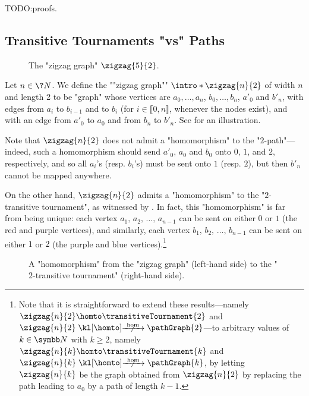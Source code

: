 TODO:proofs.

\subsection{Transitive Tournaments "vs" Paths}

\begin{figure}
	\centering
	\begin{tikzpicture}
		
		
	\end{tikzpicture}
	\caption{\AP\label{fig:zigzag-graph}The "zigzag graph" $\zigzag{5}{2}$.}
\end{figure}
\begin{example}
	\AP\label{ex:zigzag-defn}
	Let $n\in\?N$.
	We define the \AP""zigzag graph"" $\intro*\zigzag{n}{2}$ of width $n$ and length 2
	to be "graph" whose vertices are $a_0, \hdots, a_n$, $b_0, \hdots, b_{n}$,
	$a'_0$ and $b'_n$, with edges from $a_i$ to $b_{i-1}$ and to $b_{i}$ (for $i \in \lBrack 0,n\rBrack$, whenever the nodes exist), and with an edge from $a'_0$ to $a_0$ and from $b_n$
	to $b'_n$. See  for an illustration.
	
	Note that $\zigzag{n}{2}$ does not admit a "homomorphism" to the "$2$-path"---indeed, such a homomorphism should send $a'_0$, $a_0$ and $b_0$ onto $0$, $1$, and $2$, respectively, 
	and so all $a_i$'s (resp. $b_i$'s) must be sent onto $1$ (resp. $2$), but then $b'_n$ cannot be mapped anywhere.

	On the other hand, $\zigzag{n}{2}$ admits a "homomorphism" to the "$2$-transitive tournament", as witnessed by .
	In fact, this "homomorphism" is far from being unique:
	each vertex $a_1,\,a_2,\,\hdots,\,a_{n-1}$ can be sent on either $0$ or $1$
	(the red and purple vertices), 
	and similarly, each vertex $b_1,\,b_2,\,\hdots,\,b_{n-1}$ can be sent on either $1$ or $2$
	(the purple and blue vertices).\footnote{Note that it is straightforward
	to extend these results---namely $\zigzag{n}{2} \homto \transitiveTournament{2}$
	and $\zigzag{n}{2} \nothomto \pathGraph{2}$---to arbitrary values of $k\in \N$ with
	$k\geq 2$, namely $\zigzag{n}{k} \homto \transitiveTournament{k}$
	and $\zigzag{n}{k} \nothomto \pathGraph{k}$, by letting
	$\zigzag{n}{k}$ be the graph obtained from $\zigzag{n}{2}$ by
	replacing the path leading to $a_0$ by a path of length $k-1$.
	}
\end{example}
\begin{figure}
	\centering 
	\begin{tikzpicture}
		
	\end{tikzpicture}
	\caption{\AP\label{fig:zigzag-graph-hom-T2}A "homomorphism" from the "zigzag graph" (left-hand side) to the "$2$-transitive tournament" (right-hand side).}
\end{figure}